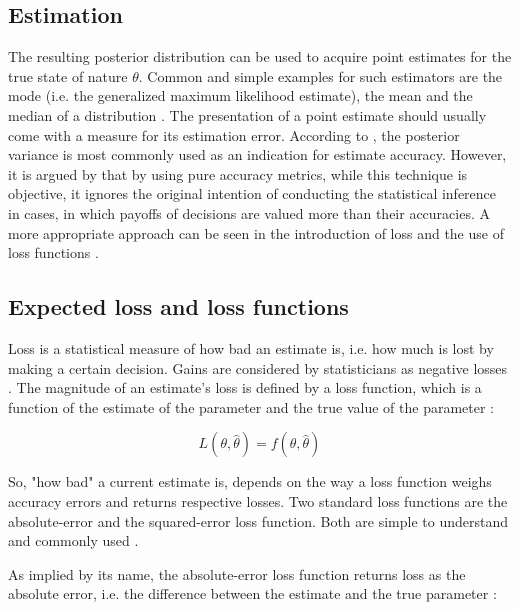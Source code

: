         \subsection{Estimation}
        The resulting posterior distribution can be used to acquire point estimates for the true state of nature $\theta$. Common and simple examples for such estimators are the mode (i.e. the generalized maximum likelihood estimate), the mean and the median of a distribution \citep{berger2013stat}. The presentation of a point estimate should usually come with a measure for its estimation error. According to \citet{berger2013stat}, the posterior variance is most commonly used as an indication for estimate accuracy. However, it is argued by \citet{davidson2015} that by using pure accuracy metrics, while this technique is objective, it ignores the original intention of conducting the statistical inference in cases, in which payoffs of decisions are valued more than their accuracies. A more appropriate approach can be seen in the introduction of loss and the use of loss functions \citep{davidson2015}.
        
        \subsection{Expected loss and loss functions}\label{sec:loss} 
        Loss is a statistical measure of how bad an estimate is, i.e. how much is lost by making a certain decision. Gains are considered by statisticians as negative losses \citep{davidson2015}.
        The magnitude of an estimate's loss is defined by a loss function, which is a function of the estimate of the parameter and the true value of the parameter \citep{davidson2015}:
        
        \begin{equation}\label{eq:LossFunction}
        L(\theta,\hat{\theta}) = f(\theta,\hat{\theta})
        \end{equation}
        
        So, "how bad" a current estimate is, depends on the way a loss function weighs accuracy errors and returns respective losses. Two standard loss functions are the absolute-error and the squared-error loss function. Both are simple to understand and commonly used \citep{davidson2015}.
        
        As implied by its name, the absolute-error loss function returns loss as the absolute error, i.e. the difference between the estimate and the true parameter \citep{davidson2015}:
        
